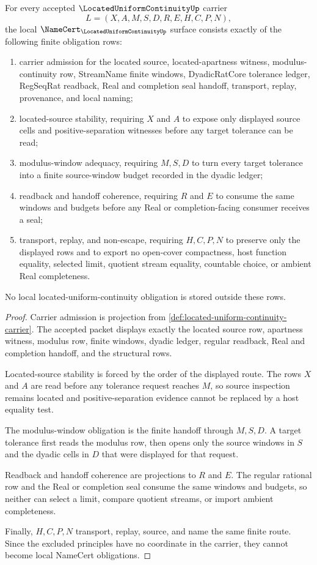 \begin{theorem}
\label{thm:located-uniform-continuity-namecert-obligations}
For every accepted $\LocatedUniformContinuityUp$ carrier
$$
L=(X,A,M,S,D,R,E,H,C,P,N),
$$
the local $\NameCert_{\LocatedUniformContinuityUp}$ surface consists exactly of the following finite obligation rows:
\begin{enumerate}
\item carrier admission for the located source, located-apartness witness, modulus-continuity row, StreamName finite windows, DyadicRatCore tolerance ledger, RegSeqRat readback, Real and completion seal handoff, transport, replay, provenance, and local naming;
\item located-source stability, requiring $X$ and $A$ to expose only displayed source cells and positive-separation witnesses before any target tolerance can be read;
\item modulus-window adequacy, requiring $M,S,D$ to turn every target tolerance into a finite source-window budget recorded in the dyadic ledger;
\item readback and handoff coherence, requiring $R$ and $E$ to consume the same windows and budgets before any Real or completion-facing consumer receives a seal;
\item transport, replay, and non-escape, requiring $H,C,P,N$ to preserve only the displayed rows and to export no open-cover compactness, host function equality, selected limit, quotient stream equality, countable choice, or ambient Real completeness.
\end{enumerate}
No local located-uniform-continuity obligation is stored outside these rows.
\end{theorem}
\begin{proof}
Carrier admission is projection from \autoref{def:located-uniform-continuity-carrier}. The accepted packet displays exactly the located source row, apartness witness, modulus row, finite windows, dyadic ledger, regular readback, Real and completion handoff, and the structural rows.

Located-source stability is forced by the order of the displayed route. The rows $X$ and $A$ are read before any tolerance request reaches $M$, so source inspection remains located and positive-separation evidence cannot be replaced by a host equality test.

The modulus-window obligation is the finite handoff through $M,S,D$. A target tolerance first reads the modulus row, then opens only the source windows in $S$ and the dyadic cells in $D$ that were displayed for that request.

Readback and handoff coherence are projections to $R$ and $E$. The regular rational row and the Real or completion seal consume the same windows and budgets, so neither can select a limit, compare quotient streams, or import ambient completeness.

Finally, $H,C,P,N$ transport, replay, source, and name the same finite route. Since the excluded principles have no coordinate in the carrier, they cannot become local NameCert obligations.
\end{proof}


